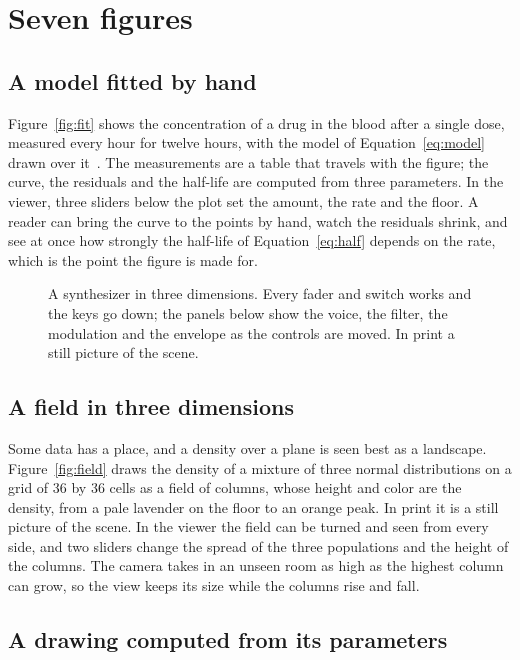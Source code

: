 \documentclass[10pt,twocolumn]{article}
\newcommand\figurehint{%
  \par\vspace{4pt}\hfill\sflhint[\textcolor{hint}{\itshape\footnotesize Interactive figure: open this PDF with the stickyflow
  extension}]\par\smallskip}
\begin{document}
\section{Seven figures}

\subsection{A model fitted by hand}

Figure~\ref{fig:fit} shows the concentration of a drug in the blood after a single dose, measured every hour for twelve hours, with
the model of Equation~\ref{eq:model} drawn over it~\cite{gibaldi}. The measurements are a table that travels with the figure; the
curve, the residuals and the half-life are computed from three parameters. In the viewer, three sliders below the plot set the
amount, the rate and the floor. A reader can bring the curve to the points by hand, watch the residuals shrink, and see at once how
strongly the half-life of Equation~\ref{eq:half} depends on the rate, which is the point the figure is made for.

\begin{figure}[t]
\figurehint
\centering
{}
\caption{A synthesizer in three dimensions. Every fader and switch works and the keys go down; the panels below show the voice, the
filter, the modulation and the envelope as the controls are moved. In print a still picture of the scene.}
\label{fig:juno}
\end{figure}

\subsection{A field in three dimensions}

Some data has a place, and a density over a plane is seen best as a landscape. Figure~\ref{fig:field} draws the density of a mixture
of three normal distributions on a grid of 36 by 36 cells as a field of columns, whose height and color are the density, from a pale
lavender on the floor to an orange peak. In print it is a still picture of the scene. In the viewer the field can be turned and seen
from every side, and two sliders change the spread of the three populations and the height of the columns. The camera takes in an
unseen room as high as the highest column can grow, so the view keeps its size while the columns rise and fall.

\subsection{A drawing computed from its parameters}
\end{document}
